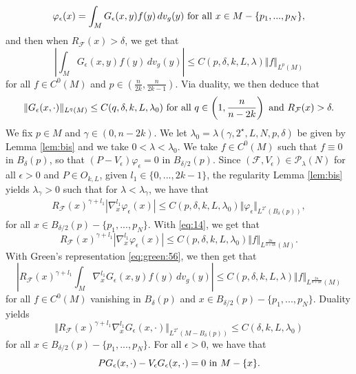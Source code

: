 \documentclass[reqno]{amsart}
\def \eps {\epsilon}
\def \crit {2^\star}
\def \Pl {{\mathcal P}_\lambda}
\def \F {{\mathcal F}}
\begin{document}
\begin{equation}\label{eq:green:56}
\varphi_\eps(x)=\int_M G_\eps(x,y)f(y)\, dv_g(y)\hbox{ for all }x\in M- \{p_1,...,p_N\},
\end{equation}
and then when $R_{\F}(x)>\delta$, we get that
$$\left|\int_M G_\eps(x,y)f(y)\, dv_g(y)\right|\leq C(p,\delta,k, L,\lambda) 
\Vert f\Vert_{L^p(M)}$$
for all $f\in C^{0}(M)$ and $p\in \left(\frac{n}{2k},\frac{n}{2k-1}\right)$. Via duality, we then deduce that 
\begin{equation}\label{eq:16}
\Vert G_\eps(x,\cdot)\Vert_{L^q(M)}\leq C(q,\delta, k, L,\lambda_0)\hbox{ for all }q\in \left(1,\frac{n}{n-2k}\right)\hbox{ and }R_{\F}(x)>\delta. 
\end{equation}
We   fix $p\in M$ and $\gamma\in (0,n-2k)$. We let $\lambda_0=\lambda(\gamma,\crit, L,N,p,\delta)$ be given by Lemma \ref{lem:bis} and we take $0<\lambda<\lambda_0$. We take $f\in C^0(M)$ such that $f\equiv 0$ in $B_{\delta}(p)$, so that $(P-V_\eps)\varphi_\eps=0$ in $B_{\delta/2}(p)$. Since $(\F,V_\eps)\in \Pl(N)$ for all $\eps>0$ and $P\in O_{k,L}$, given $l_1\in\{0,...,2k-1\}$, the regularity Lemma \ref{lem:bis} yields $\lambda_\gamma>0$ such that for $\lambda<\lambda_\gamma$, we have that
\begin{eqnarray*}
R_{\F}(x)^{\gamma+l_1}|\nabla_x^{l_1}\varphi_\eps(x)|\leq C(p,\delta,k, L,\lambda_0) \Vert \varphi_\eps\Vert_{L^{\crit}(B_{\delta}(p))},
\end{eqnarray*}
for all $x\in B_{\delta/2}(p)- \{p_1,...,p_N\}$. With \eqref{eq:14}, we get that
\begin{equation*}
R_{\F}(x)^{\gamma+l_1}|\nabla_x^{l_1}\varphi_\eps(x)|\leq  C(p,\delta,k, L,\lambda_0) 
\Vert f\Vert_{L^{\frac{2n}{n+2k}}(M)}. 
\end{equation*}
With Green's representation \eqref{eq:green:56}, we then get that
$$\left|R_{\F}(x)^{\gamma+l_1}\int_M \nabla_x^{l_1}G_\eps(x,y)f(y)\, dv_g(y)\right|\leq C(p,\delta,k, L,\lambda) 
\Vert f\Vert_{L^{\frac{2n}{n+2k}}(M)}$$
for all $f\in C^{0}(M)$ vanishing in $B_{\delta}(p)$ and  $x\in B_{\delta/2}(p)- \{p_1,...,p_N\}$. Duality yields
\begin{equation}\label{eq:16:crit}
\Vert R_{\F}(x)^{\gamma+l_1} \nabla_x^{l_1} G_\eps(x,\cdot)\Vert_{L^{\crit}(M -  B_{\delta}(p))}\leq C(\delta, k, L,\lambda_0)
\end{equation}
for all $x\in B_{\delta/2}(p)- \{p_1,...,p_N\}$. For all $\eps>0$, we have that 
\begin{equation}\label{eq:Ge}
P G_\eps(x,\cdot)-V_\eps G_\eps(x,\cdot)=0\hbox{ in }M-\{x\}.
\end{equation}
\end{document}
